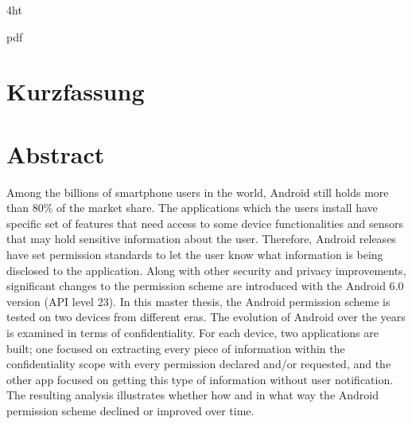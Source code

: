 \documentclass[
  a4paper,  %
  twoside,  %
  bibliography=totoc,
  headsepline,
  cleardoublepage=empty,
  parskip=half,
  draft=false,
  open=any
]{scrbook}
\begin{document}
\iftex4ht
  \Configure{$}{\PicMath}{\EndPicMath}{}

  {pdf}
  {%
  }
\fi



\Titelblatt

\pagestyle{preamble}
\renewcommand*{\chapterpagestyle}{preamble}



\ifdeutsch
  \section*{Kurzfassung}
\else
  \section*{Abstract}
\fi

Among the billions of smartphone users in the world, Android still holds more than 80\% of the market share. The applications which the users install have specific set of features that need access to some device functionalities and sensors that may hold sensitive information about the user. Therefore, Android releases have set permission standards to let the user know what information is being disclosed to the application. Along with other security and privacy improvements, significant changes to the permission scheme are introduced with the Android 6.0 version (API level 23). In this master thesis, the Android permission scheme is tested on two devices from different eras. The evolution of Android over the years is examined in terms of confidentiality. For each device, two applications are built; one focused on extracting every piece of information within the confidentiality scope with every permission declared and/or requested, and the other app focused on getting this type of information without user notification. The resulting analysis illustrates whether how and in what way the Android permission scheme declined or improved over time.
 
\end{document}
